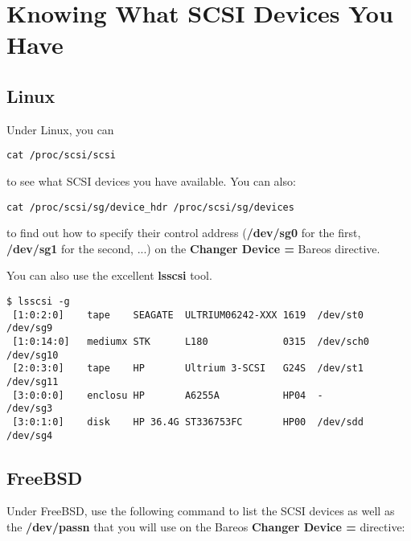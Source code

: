 \label{SCSI devices}
\section{Knowing What SCSI Devices You Have}

\subsection{Linux}
Under Linux, you can

\footnotesize
\begin{verbatim}
cat /proc/scsi/scsi
\end{verbatim}
\normalsize

to see what SCSI devices you have available. You can also:

\footnotesize
\begin{verbatim}
cat /proc/scsi/sg/device_hdr /proc/scsi/sg/devices
\end{verbatim}
\normalsize

to find out how to specify their control address ({\bf /dev/sg0} for the
first, {\bf /dev/sg1} for the second, ...) on the {\bf Changer Device = }
Bareos directive.

You can also use the excellent  {\bf lsscsi} tool.
\footnotesize
\begin{verbatim}
$ lsscsi -g
 [1:0:2:0]    tape    SEAGATE  ULTRIUM06242-XXX 1619  /dev/st0  /dev/sg9
 [1:0:14:0]   mediumx STK      L180             0315  /dev/sch0 /dev/sg10
 [2:0:3:0]    tape    HP       Ultrium 3-SCSI   G24S  /dev/st1  /dev/sg11
 [3:0:0:0]    enclosu HP       A6255A           HP04  -         /dev/sg3
 [3:0:1:0]    disk    HP 36.4G ST336753FC       HP00  /dev/sdd  /dev/sg4
\end{verbatim}
\normalsize


\subsection{FreeBSD}
Under FreeBSD, use the following command to list the SCSI devices as well as the {\bf /dev/passn} that you will use on
the Bareos {\bf Changer Device = } directive:


